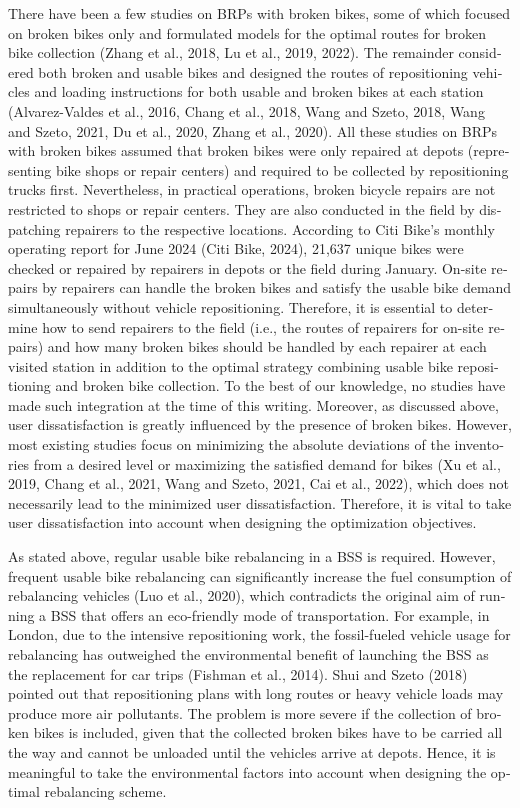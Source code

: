\documentclass[
  english,
]{article}
\begin{document}
\begin{otherlanguage}{english}
\protect{}\label{p0045}
There have been a few studies on BRPs with broken bikes, some of which focused on broken bikes only
and formulated models for the optimal routes for broken bike collection (Zhang et al., 2018, Lu et
al., 2019, 2022). The remainder considered both broken and usable bikes and designed the routes of
repositioning vehicles and loading instructions for both usable and broken bikes at each station
(Alvarez-Valdes et al., 2016, Chang et al., 2018, Wang and Szeto, 2018, Wang and Szeto, 2021, Du et
al., 2020, Zhang et al., 2020). All these studies on BRPs with broken bikes assumed that broken
bikes were only repaired at depots (representing bike shops or repair centers) and required to be
collected by repositioning trucks first. Nevertheless, in practical operations, broken bicycle
repairs are not restricted to shops or repair centers. They are also conducted in the field by
dispatching repairers to the respective locations. According to Citi Bike's monthly operating report
for June 2024 (Citi Bike, 2024), 21,637 unique bikes were checked or repaired by repairers in depots
or the field during January. On-site repairs by repairers can handle the broken bikes and satisfy
the usable bike demand simultaneously without vehicle repositioning. Therefore, it is essential to
determine how to send repairers to the field (i.e., the routes of repairers for on-site repairs) and
how many broken bikes should be handled by each repairer at each visited station in addition to the
optimal strategy combining usable bike repositioning and broken bike collection. To the best of our
knowledge, no studies have made such integration at the time of this writing. Moreover, as discussed
above, user dissatisfaction is greatly influenced by the presence of broken bikes. However, most
existing studies focus on minimizing the absolute deviations of the inventories from a desired level
or maximizing the satisfied demand for bikes (Xu et al., 2019, Chang et al., 2021, Wang and Szeto,
2021, Cai et al., 2022), which does not necessarily lead to the minimized user dissatisfaction.
Therefore, it is vital to take user dissatisfaction into account when designing the optimization
objectives.

\protect{}\label{p0050}
As stated above, regular usable bike rebalancing in a BSS is required. However, frequent usable bike
rebalancing can significantly increase the fuel consumption of rebalancing vehicles (Luo et al.,
2020), which contradicts the original aim of running a BSS that offers an eco-friendly mode of
transportation. For example, in London, due to the intensive repositioning work, the fossil-fueled
vehicle usage for rebalancing has outweighed the environmental benefit of launching the BSS as the
replacement for car trips (Fishman et al., 2014). Shui and Szeto (2018) pointed out that
repositioning plans with long routes or heavy vehicle loads may produce more air pollutants. The
problem is more severe if the collection of broken bikes is included, given that the collected
broken bikes have to be carried all the way and cannot be unloaded until the vehicles arrive at
depots. Hence, it is meaningful to take the environmental factors into account when designing the
optimal rebalancing scheme.


\end{otherlanguage}
\end{document}
